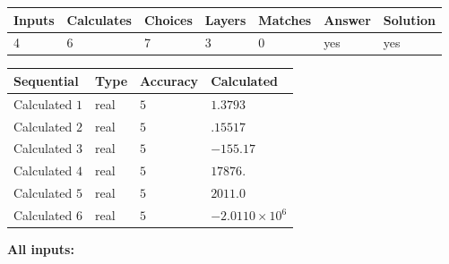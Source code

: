 \documentclass[12pt]{article}
\begin{document}
 

 
\vspace{0.3in}
   
   
   
   
\noindent\begin{tabular}{|l|l|l|l|l|l|l|}
 \hline
Inputs & Calculates & Choices & Layers & Matches & Answer & Solution \\ \hline
           4 & 
           6 & 
           7
  & 
           3 & 
           0 & 
  yes & 
  yes 
  \\ \hline
 \end{tabular}
   
   
   
   
\noindent{}
   
   
  
  
\noindent\begin{tabular}{|l|l|l|l|}
\hline
 Sequential & Type & Accuracy & Calculated \\ 
\hline
 
 
  Calculated $           1$ & real & $           5 $ & 
 $ 1.3793 $ 
 \\  \hline  
 
 
  Calculated $           2$ & real & $           5 $ & 
 $ .15517 $ 
 \\  \hline  
 
 
  Calculated $           3$ & real & $           5 $ & 
 $ -155.17 $ 
 \\  \hline  
 
 
  Calculated $           4$ & real & $           5 $ & 
 $ 17876. $ 
 \\  \hline  
 
 
  Calculated $           5$ & real & $           5 $ & 
 $ 2011.0 $ 
 \\  \hline  
 
 
  Calculated $           6$ & real & $           5 $ & 
 $ -2.0110 \times 10^{6} $ 
 \\  \hline  
 \end{tabular}
   
   
   
   
\noindent\vspace{0.1in}\hspace{-0.08in} {\textbf{\Large{All inputs: }}}
   
   
  
\end{document}
